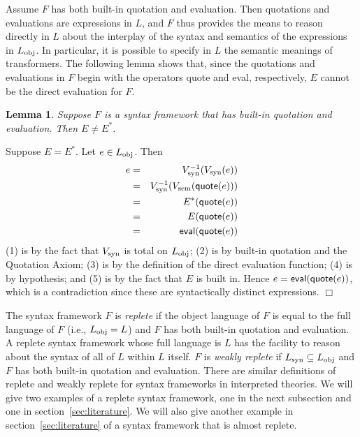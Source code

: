 \documentclass[11pt,fleqn]{article}
\newcommand{\dblsp}{\ \ }
\newcommand{\mname}[1]{\mbox{\sf #1}}
\newtheorem{lem}[thm]{Lemma}
\newenvironment{proof}{\par\noindent{\bf Proof\dblsp}}{\hfill$\Box$}
\begin{document}
Assume $F$ has both built-in quotation and evaluation.  Then
quotations and evaluations are expressions in $L$, and $F$ thus
provides the means to reason directly in $L$ about the interplay of
the syntax and semantics of the expressions in $L_{\rm obj}$.  In
particular, it is possible to specify in $L$ the semantic meanings of
transformers.  The following lemma shows that, since the quotations
and evaluations in $F$ begin with the operators \mname{quote} and
\mname{eval}, respectively, $E$ cannot be the direct evaluation for
$F$.  

\begin{lem}
Suppose $F$ is a syntax framework that has built-in quotation and
evaluation.  Then $E \not= E^{\ast}$.
\end{lem}

\begin{proof}
Suppose $E = E^{\ast}$.  Let $e \in L_{\rm obj}$.  Then
\setcounter{equation}{0}
\begin{eqnarray}
e & = & V_{\rm syn}^{-1}(V_{\rm syn}(e)) \\
  & = & V_{\rm syn}^{-1}(V_{\rm sem}(\mname{quote}(e))) \\
  & = & E^{\ast}(\mname{quote}(e)) \\
  & = & E(\mname{quote}(e)) \\
  & = & \mname{eval}(\mname{quote}(e)) 
\end{eqnarray}
(1) is by the fact that $V_{\rm syn}$ is total on $L_{\rm obj}$; (2)
is by built-in quotation and the Quotation Axiom; (3) is by the
definition of the direct evaluation function; (4) is by hypothesis;
and (5) is by the fact that $E$ is built in.  Hence $e =
\mname{eval}(\mname{quote}(e))$, which is a contradiction since these
are syntactically distinct expressions.
\end{proof}

\bigskip

The syntax framework $F$ is \emph{replete} if the object language of
$F$ is equal to the full language of $F$ (i.e., $L_{\rm obj} = L$) and
$F$ has both built-in quotation and evaluation.  A replete syntax
framework whose full language is $L$ has the facility to reason about
the syntax of all of $L$ within $L$ itself.  $F$ is \emph{weakly
  replete} if $L_{\rm syn} \subseteq L_{\rm obj}$ and $F$ has both
built-in quotation and evaluation.  There are similar definitions of
replete and weakly replete for syntax frameworks in interpreted
theories.  We will give two examples of a replete syntax framework,
one in the next subsection and one in section~\ref{sec:literature}.
We will also give another example in section~\ref{sec:literature} of a
syntax framework that is almost replete.
\end{document}

